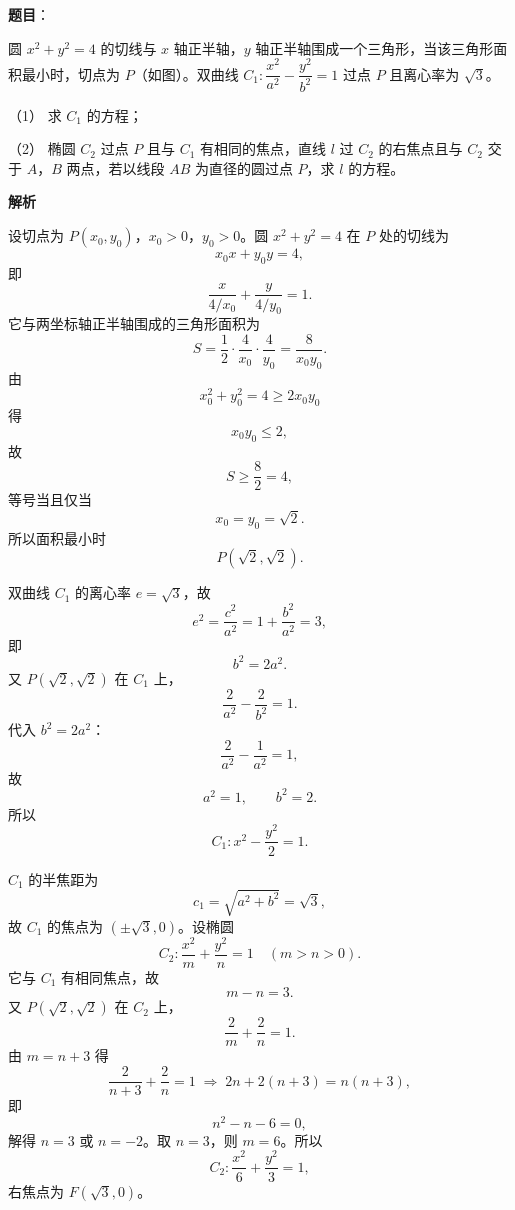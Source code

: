 \begin{answer}

\textbf{题目}：

圆 $x^2+y^2=4$ 的切线与 $x$ 轴正半轴，$y$ 轴正半轴围成一个三角形，当该三角形面积最小时，切点为 $P$（如图）。双曲线 $C_1:\dfrac{x^2}{a^2}-\dfrac{y^2}{b^2}=1$ 过点 $P$ 且离心率为 $\sqrt3$。
\nopagebreak[4]
\begin{center}\end{center}
\nopagebreak[4]
（1） 求 $C_1$ 的方程；

（2） 椭圆 $C_2$ 过点 $P$ 且与 $C_1$ 有相同的焦点，直线 $l$ 过 $C_2$ 的右焦点且与 $C_2$ 交于 $A$，$B$ 两点，若以线段 $AB$ 为直径的圆过点 $P$，求 $l$ 的方程。

\textbf{解析}


设切点为 $P(x_0,y_0)$，$x_0>0$，$y_0>0$。圆 $x^2+y^2=4$ 在 $P$ 处的切线为
\nopagebreak[4]
\[x_0x+y_0y=4,\]
即
\nopagebreak[4]
\[\frac{x}{4/x_0}+\frac{y}{4/y_0}=1.\]
它与两坐标轴正半轴围成的三角形面积为
\nopagebreak[4]
\[S=\frac12\cdot\frac4{x_0}\cdot\frac4{y_0}
=\frac8{x_0y_0}.\]
由
\nopagebreak[4]
\[x_0^2+y_0^2=4\geqslant2x_0y_0\]
得
\nopagebreak[4]
\[x_0y_0\leqslant2,\]
故
\nopagebreak[4]
\[S\geqslant\frac82=4,\]
等号当且仅当
\nopagebreak[4]
\[x_0=y_0=\sqrt2.\]
所以面积最小时
\nopagebreak[4]
\[P(\sqrt2,\sqrt2).\]

双曲线 $C_1$ 的离心率 $e=\sqrt3$，故
\nopagebreak[4]
\[e^2=\frac{c^2}{a^2}=1+\frac{b^2}{a^2}=3,\]
即
\nopagebreak[4]
\[b^2=2a^2.\]
又 $P(\sqrt2,\sqrt2)$ 在 $C_1$ 上，
\nopagebreak[4]
\[\frac2{a^2}-\frac2{b^2}=1.\]
代入 $b^2=2a^2$：
\nopagebreak[4]
\[\frac2{a^2}-\frac1{a^2}=1,\]
故
\nopagebreak[4]
\[a^2=1,\qquad b^2=2.\]
所以
\nopagebreak[4]
\[C_1:x^2-\frac{y^2}2=1.\]


$C_1$ 的半焦距为
\nopagebreak[4]
\[c_1=\sqrt{a^2+b^2}=\sqrt3,\]
故 $C_1$ 的焦点为 $(\pm\sqrt3,0)$。设椭圆
\nopagebreak[4]
\[C_2:\frac{x^2}{m}+\frac{y^2}{n}=1\quad(m>n>0).\]
它与 $C_1$ 有相同焦点，故
\nopagebreak[4]
\[m-n=3.\]
又 $P(\sqrt2,\sqrt2)$ 在 $C_2$ 上，
\nopagebreak[4]
\[\frac2m+\frac2n=1.\]
由 $m=n+3$ 得
\nopagebreak[4]
\[\frac2{n+3}+\frac2n=1
\;\Longrightarrow\;
2n+2(n+3)=n(n+3),\]
即
\nopagebreak[4]
\[n^2-n-6=0,\]
解得 $n=3$ 或 $n=-2$。取 $n=3$，则 $m=6$。所以
\nopagebreak[4]
\[C_2:\frac{x^2}6+\frac{y^2}3=1,\]
右焦点为 $F(\sqrt3,0)$。


\end{answer}
